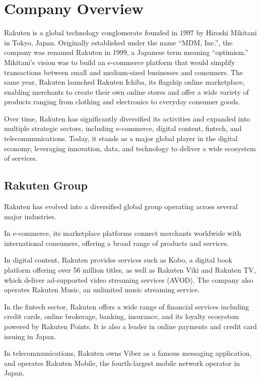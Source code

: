\chapter{Company Overview}

Rakuten is a global technology conglomerate founded in 1997 by Hiroshi Mikitani in Tokyo, Japan. Originally established under the name “MDM, Inc.”, the company was renamed Rakuten in 1999, a Japanese term meaning “optimism.” Mikitani’s vision was to build an e-commerce platform that would simplify transactions between small and medium-sized businesses and consumers. The same year, Rakuten launched Rakuten Ichiba, its flagship online marketplace, enabling merchants to create their own online stores and offer a wide variety of products ranging from clothing and electronics to everyday consumer goods.

Over time, Rakuten has significantly diversified its activities and expanded into multiple strategic sectors, including e-commerce, digital content, fintech, and telecommunications. Today, it stands as a major global player in the digital economy, leveraging innovation, data, and technology to deliver a wide ecosystem of services.

\section{Rakuten Group}

Rakuten has evolved into a diversified global group operating across several major industries.

In e-commerce, its marketplace platforms connect merchants worldwide with international consumers, offering a broad range of products and services.

In digital content, Rakuten provides services such as Kobo, a digital book platform offering over 56 million titles, as well as Rakuten Viki and Rakuten TV, which deliver ad-supported video streaming services (AVOD). The company also operates Rakuten Music, an unlimited music streaming service.

In the fintech sector, Rakuten offers a wide range of financial services including credit cards, online brokerage, banking, insurance, and its loyalty ecosystem powered by Rakuten Points. It is also a leader in online payments and credit card issuing in Japan.

In telecommunications, Rakuten owns Viber as a famous messaging application, and operates Rakuten Mobile, the fourth-largest mobile network operator in Japan.

